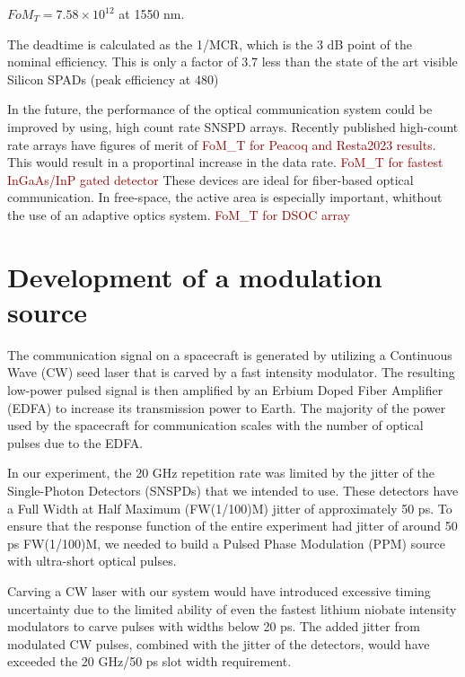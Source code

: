 \documentclass[11pt]{caltech_thesis} %
\begin{document}
\(FoM_T = 7.58 \times 10^{12}\) at 1550 nm.

The deadtime is calculated as the 1/MCR, which is the 3 dB point of the
nominal efficiency. This is only a factor of 3.7 less than the state of
the art visible Silicon SPADs (peak efficiency at 480)
\autocite{Gramuglia2022}

In the future, the performance of the optical communication system could
be improved by using, high count rate SNSPD arrays. Recently published
high-count rate arrays have figures of merit of
\textcolor{darkred}{FoM\_T for Peacoq and Resta2023 results}. This would
result in a proportinal increase in the data rate.
\textcolor{darkred}{FoM\_T for fastest InGaAs/InP gated detector} These
devices are ideal for fiber-based optical communication. In free-space,
the active area is especially important, whithout the use of an adaptive
optics system. \textcolor{darkred}{FoM\_T for DSOC array}

\hypertarget{development-of-a-modulation-source}{%
\section{Development of a modulation
source}\label{development-of-a-modulation-source}}

The communication signal on a spacecraft is generated by utilizing a
Continuous Wave (CW) seed laser that is carved by a fast intensity
modulator. The resulting low-power pulsed signal is then amplified by an
Erbium Doped Fiber Amplifier (EDFA) to increase its transmission power
to Earth. The majority of the power used by the spacecraft for
communication scales with the number of optical pulses due to the EDFA.

In our experiment, the 20 GHz repetition rate was limited by the jitter
of the Single-Photon Detectors (SNSPDs) that we intended to use. These
detectors have a Full Width at Half Maximum (FW(1/100)M) jitter of
approximately 50 ps. To ensure that the response function of the entire
experiment had jitter of around 50 ps FW(1/100)M, we needed to build a
Pulsed Phase Modulation (PPM) source with ultra-short optical pulses.

Carving a CW laser with our system would have introduced excessive
timing uncertainty due to the limited ability of even the fastest
lithium niobate intensity modulators to carve pulses with widths below
20 ps. The added jitter from modulated CW pulses, combined with the
jitter of the detectors, would have exceeded the 20 GHz/50 ps slot width
requirement.
\end{document}

